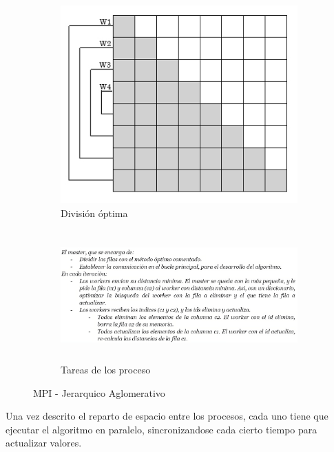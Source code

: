 		\begin{figure}[!h]
			\centering
			
			
			\begin{subfigure}[t]{0.4\textwidth}
				\centering
				\includegraphics[width=\textwidth]{images/chapter_3/aglomerativo_mpi}
				\caption{División óptima}
				\label{fig:aglomerativompi}
			\end{subfigure}
			\hfill
			\begin{subfigure}[t]{0.52\textwidth}
				\centering
				\includegraphics[width=\textwidth,height=5cm]{images/chapter_3/aglomerativo_sec}
				\caption{Tareas de los proceso}
				\label{fig:aglomerativosec}
			\end{subfigure}
			
			\caption{MPI - Jerarquico Aglomerativo}
			\label{fig:aglomerativo}
		\end{figure}
		
		
		Una vez descrito el reparto de espacio entre los procesos, cada uno tiene que ejecutar el algoritmo en paralelo, sincronizandose cada cierto tiempo para actualizar valores.
		
